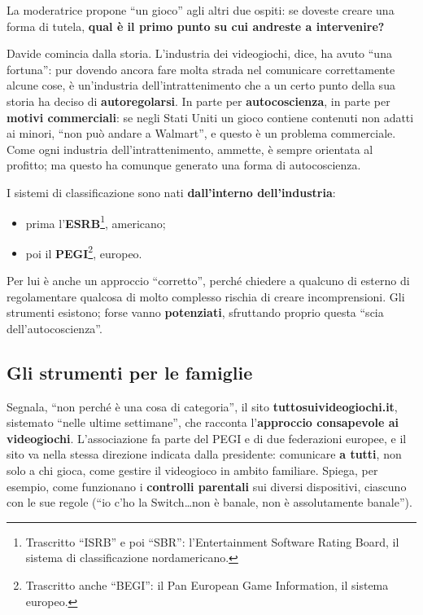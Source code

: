 La moderatrice propone ``un gioco'' agli altri due ospiti: se doveste creare
una forma di tutela, \textbf{qual è il primo punto su cui andreste a
intervenire?}

Davide comincia dalla storia. L'industria dei videogiochi, dice, ha avuto ``una
fortuna'': pur dovendo ancora fare molta strada nel comunicare correttamente
alcune cose, è un'industria dell'intrattenimento che a un certo punto della sua
storia ha deciso di \textbf{autoregolarsi}. In parte per \textbf{autocoscienza},
in parte per \textbf{motivi commerciali}: se negli Stati Uniti un gioco contiene
contenuti non adatti ai minori, ``non può andare a Walmart'', e questo è un
problema commerciale. Come ogni industria dell'intrattenimento, ammette, è
sempre orientata al profitto; ma questo ha comunque generato una forma di
autocoscienza.

I sistemi di classificazione sono nati \textbf{dall'interno dell'industria}:
\begin{itemize}
  \item prima l'\textbf{ESRB}\footnote{Trascritto ``ISRB'' e poi ``SBR'':
        l'Entertainment Software Rating Board, il sistema di classificazione
        nordamericano.}, americano;
  \item poi il \textbf{PEGI}\footnote{Trascritto anche ``BEGI'': il Pan European
        Game Information, il sistema europeo.}, europeo.
\end{itemize}
Per lui è anche un approccio ``corretto'', perché chiedere a qualcuno di esterno
di regolamentare qualcosa di molto complesso rischia di creare incomprensioni.
Gli strumenti esistono; forse vanno \textbf{potenziati}, sfruttando proprio
questa ``scia dell'autocoscienza''.

\subsection{Gli strumenti per le famiglie}

Segnala, ``non perché è una cosa di categoria'', il sito
\textbf{tuttosuivideogiochi.it}, sistemato ``nelle ultime settimane'', che
racconta l'\textbf{approccio consapevole ai videogiochi}. L'associazione fa
parte del PEGI e di due federazioni europee, e il sito va nella stessa direzione
indicata dalla presidente: comunicare \textbf{a tutti}, non solo a chi gioca,
come gestire il videogioco in ambito familiare. Spiega, per esempio, come
funzionano i \textbf{controlli parentali} sui diversi dispositivi, ciascuno con
le sue regole (``io c'ho la Switch\dots non è banale, non è assolutamente
banale'').

